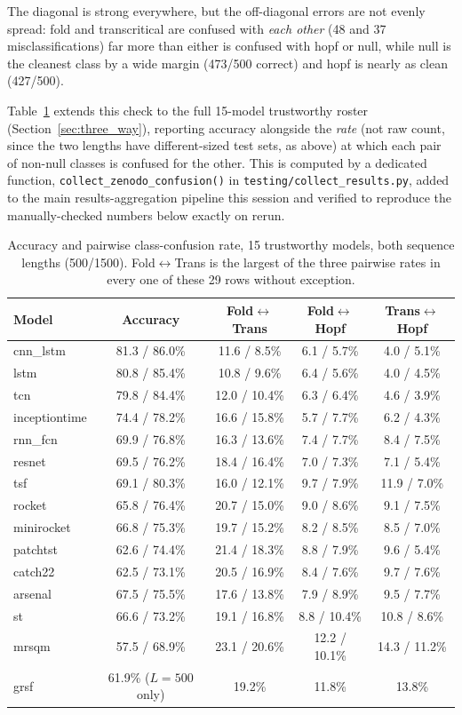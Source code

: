 The diagonal is strong everywhere, but the off-diagonal errors are not evenly spread: fold and transcritical are confused with \emph{each other} (48 and 37 misclassifications) far more than either is confused with hopf or null, while null is the cleanest class by a wide margin (473/500 correct) and hopf is nearly as clean (427/500).

Table~\ref{tab:zenodo_confusion} extends this check to the full 15-model trustworthy roster (Section~\ref{sec:three_way}), reporting accuracy alongside the \emph{rate} (not raw count, since the two lengths have different-sized test sets, as above) at which each pair of non-null classes is confused for the other. This is computed by a dedicated function, \texttt{collect\_zenodo\_confusion()} in \texttt{testing/collect\_results.py}, added to the main results-aggregation pipeline this session and verified to reproduce the manually-checked numbers below exactly on rerun.

\begin{table}[htbp]
\centering
\small
\caption{Accuracy and pairwise class-confusion rate, 15 trustworthy models, both sequence lengths (500/1500). Fold$\leftrightarrow$Trans is the largest of the three pairwise rates in every one of these 29 rows without exception.}
\label{tab:zenodo_confusion}
\begin{tabular}{lcccc}
\toprule
Model & Accuracy & Fold$\leftrightarrow$Trans & Fold$\leftrightarrow$Hopf & Trans$\leftrightarrow$Hopf \\
\midrule
cnn\_lstm & 81.3 / 86.0\% & 11.6 / 8.5\% & 6.1 / 5.7\% & 4.0 / 5.1\% \\
lstm & 80.8 / 85.4\% & 10.8 / 9.6\% & 6.4 / 5.6\% & 4.0 / 4.5\% \\
tcn & 79.8 / 84.4\% & 12.0 / 10.4\% & 6.3 / 6.4\% & 4.6 / 3.9\% \\
inceptiontime & 74.4 / 78.2\% & 16.6 / 15.8\% & 5.7 / 7.7\% & 6.2 / 4.3\% \\
rnn\_fcn & 69.9 / 76.8\% & 16.3 / 13.6\% & 7.4 / 7.7\% & 8.4 / 7.5\% \\
resnet & 69.5 / 76.2\% & 18.4 / 16.4\% & 7.0 / 7.3\% & 7.1 / 5.4\% \\
tsf & 69.1 / 80.3\% & 16.0 / 12.1\% & 9.7 / 7.9\% & 11.9 / 7.0\% \\
rocket & 65.8 / 76.4\% & 20.7 / 15.0\% & 9.0 / 8.6\% & 9.1 / 7.5\% \\
minirocket & 66.8 / 75.3\% & 19.7 / 15.2\% & 8.2 / 8.5\% & 8.5 / 7.0\% \\
patchtst & 62.6 / 74.4\% & 21.4 / 18.3\% & 8.8 / 7.9\% & 9.6 / 5.4\% \\
catch22 & 62.5 / 73.1\% & 20.5 / 16.9\% & 8.4 / 7.6\% & 9.7 / 7.6\% \\
arsenal & 67.5 / 75.5\% & 17.6 / 13.8\% & 7.9 / 8.9\% & 9.5 / 7.7\% \\
st & 66.6 / 73.2\% & 19.1 / 16.8\% & 8.8 / 10.4\% & 10.8 / 8.6\% \\
mrsqm & 57.5 / 68.9\% & 23.1 / 20.6\% & 12.2 / 10.1\% & 14.3 / 11.2\% \\
grsf & 61.9\% ($L{=}500$ only) & 19.2\% & 11.8\% & 13.8\% \\
\bottomrule
\end{tabular}
\end{table}

